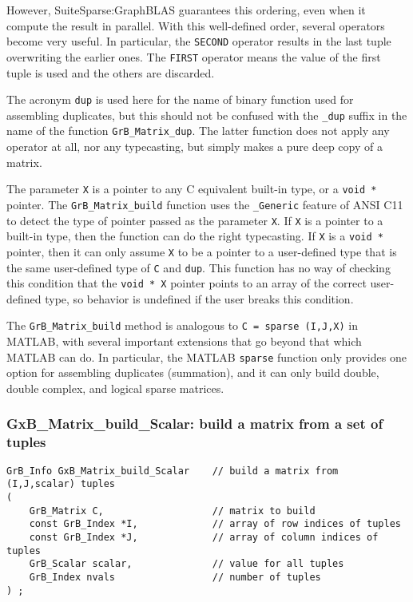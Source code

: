 \documentclass[12pt]{article}
\begin{document}
However, SuiteSparse:GraphBLAS guarantees this ordering, even when it compute
the result in parallel.  With this well-defined order, several operators become
very useful.  In particular, the \verb'SECOND' operator results in the last
tuple overwriting the earlier ones.  The \verb'FIRST' operator means the value
of the first tuple is used and the others are discarded.

The acronym \verb'dup' is used here for the name of binary function used for
assembling duplicates, but this should not be confused with the \verb'_dup'
suffix in the name of the function \verb'GrB_Matrix_dup'.  The latter function
does not apply any operator at all, nor any typecasting, but simply makes a
pure deep copy of a matrix.

The parameter \verb'X' is a pointer to any C equivalent built-in type, or a
\verb'void *' pointer.  The \verb'GrB_Matrix_build' function uses the
\verb'_Generic' feature of ANSI C11 to detect the type of pointer passed as the
parameter \verb'X'.  If \verb'X' is a pointer to a built-in type, then the
function can do the right typecasting.  If \verb'X' is a \verb'void *' pointer,
then it can only assume \verb'X' to be a pointer to a user-defined type that is
the same user-defined type of \verb'C' and \verb'dup'.  This function has no
way of checking this condition that the \verb'void * X' pointer points to an
array of the correct user-defined type, so behavior is undefined if the user
breaks this condition.

The \verb'GrB_Matrix_build' method is analogous to \verb'C = sparse (I,J,X)' in
MATLAB, with several important extensions that go beyond that which MATLAB can
do.  In particular, the MATLAB \verb'sparse' function only provides one option
for assembling duplicates (summation), and it can only build double, double
complex, and logical sparse matrices.

\subsubsection{{\sf GxB\_Matrix\_build\_Scalar:} build a matrix from a set of tuples}
\label{matrix_build_Scalar}

\begin{mdframed}[userdefinedwidth=6in]
{\footnotesize
\begin{verbatim}
GrB_Info GxB_Matrix_build_Scalar    // build a matrix from (I,J,scalar) tuples
(
    GrB_Matrix C,                   // matrix to build
    const GrB_Index *I,             // array of row indices of tuples
    const GrB_Index *J,             // array of column indices of tuples
    GrB_Scalar scalar,              // value for all tuples
    GrB_Index nvals                 // number of tuples
) ;
\end{verbatim} } \end{mdframed}
\end{document}
